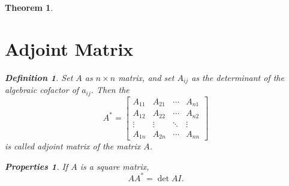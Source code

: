 \documentclass{article}
\newtheorem{theorem}{Theorem}[section]
\theoremstyle{definition}
\newtheorem{defi}{Definition}[section]
\newtheorem{pro}{Properties}[section]
\begin{document}
\begin{theorem}
\section{Adjoint Matrix}
\begin{defi}
    Set $A$ as $n\times n$ matrix, and set $A_{ij}$ as the 
    determinant of the algebraic cofactor of $a_{ij}$. Then the 
    $$
    A^{*}
    =\begin{bmatrix}
        A_{11} & A_{21} & \cdots & A_{n1}\\
        A_{12} & A_{22} & \cdots & A_{n2}\\
        \vdots & \vdots & \ddots & \vdots\\
        A_{1n} & A_{2n} & \cdots & A_{nn}
    \end{bmatrix}
    $$
    is called adjoint matrix of the matrix $A$.
\end{defi}
\begin{pro}
    If $A$ is a square matrix, $$AA^{*}=\det{A}I.$$
\end{pro}


\end{theorem}
\end{document}

